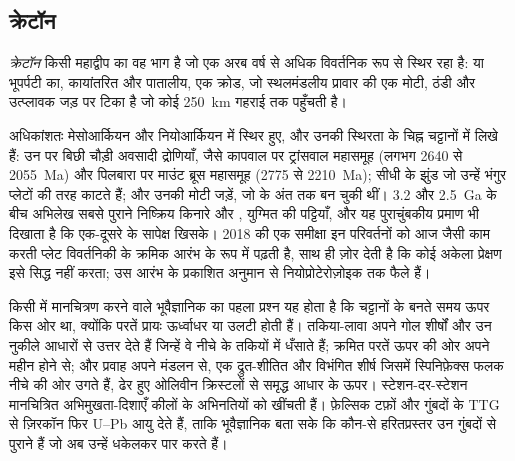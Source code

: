 \subsection*{क्रेटॉन}

\begin{definition}[क्रेटॉन]\label{def:b2:precambrian-earth:craton}
\emph{क्रेटॉन} किसी महाद्वीप का वह भाग है जो एक अरब वर्ष से अधिक
विवर्तनिक रूप से स्थिर रहा है:  या  भूपर्पटी का, कायांतरित और
पातालीय, एक क्रोड, जो स्थलमंडलीय प्रावार की एक मोटी, ठंडी और उत्प्लावक जड़ पर टिका है जो कोई
\qty{250}{km} गहराई तक पहुँचती है।
\end{definition}

 अधिकांशतः मेसोआर्कियन और नियोआर्कियन में स्थिर हुए, और उनकी
स्थिरता के चिह्न चट्टानों में लिखे हैं: उन पर बिछी चौड़ी अवसादी द्रोणियाँ, जैसे
कापवाल  पर ट्रांसवाल महासमूह (लगभग 2640 से \qty{2055}{Ma}) और पिलबारा पर माउंट ब्रूस
महासमूह (2775 से \qty{2210}{Ma}); सीधी  के झुंड जो उन्हें
भंगुर प्लेटों की तरह काटते हैं; और उनकी मोटी जड़ें, जो  के अंत तक बन चुकी थीं। 3.2 और
\qty{2.5}{Ga} के बीच अभिलेख सबसे पुराने निष्क्रिय किनारे और , युग्मित
 की पट्टियाँ, और यह पुराचुंबकीय प्रमाण भी दिखाता है कि  एक-दूसरे के सापेक्ष खिसके।
2018 की एक समीक्षा इन परिवर्तनों को आज जैसी काम करती प्लेट विवर्तनिकी के क्रमिक आरंभ के रूप में पढ़ती है,
साथ ही ज़ोर देती है कि कोई अकेला प्रेक्षण इसे सिद्ध नहीं करता; उस आरंभ के प्रकाशित अनुमान
 से नियोप्रोटेरोज़ोइक तक फैले हैं।

\begin{inthefield}[हरितप्रस्तर पट्टी को पढ़ना]
किसी  में मानचित्रण करने वाले भूवैज्ञानिक का पहला प्रश्न यह होता है कि चट्टानों के बनते समय
ऊपर किस ओर था, क्योंकि परतें प्रायः ऊर्ध्वाधर या उलटी होती हैं। तकिया-लावा
अपने गोल शीर्षों और उन नुकीले आधारों से उत्तर देते हैं जिन्हें वे नीचे के तकियों में धँसाते हैं; क्रमित परतें
ऊपर की ओर अपने महीन होने से; और  प्रवाह अपने मंडलन से, एक द्रुत-शीतित और विभंगित शीर्ष
जिसमें स्पिनिफ़ेक्स फलक नीचे की ओर उगते हैं, ढेर हुए ओलिवीन क्रिस्टलों से समृद्ध आधार के ऊपर। स्टेशन-दर-स्टेशन
मानचित्रित अभिमुखता-दिशाएँ कीलों के अभिनतियों को खींचती हैं। फ़ेल्सिक टफ़ों
और गुंबदों के TTG से ज़िरकॉन फिर U--Pb आयु देते हैं, ताकि भूवैज्ञानिक बता सके कि कौन-से
हरितप्रस्तर उन गुंबदों से पुराने हैं जो अब उन्हें धकेलकर पार करते हैं।
\end{inthefield}

